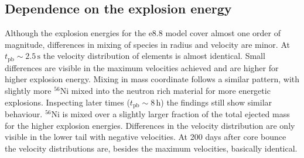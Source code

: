\documentclass[fleqn,usenatbib]{mnras}
\newcommand{\nickel}{\ensuremath{\mathrm{^{56}Ni}}\xspace}
\begin{document}
\subsection{Dependence on the explosion energy}
\label{sec:Dependence on the explosion energy}

Although the explosion energies for the e8.8 model cover almost one order of magnitude, differences in mixing of species in radius and velocity are minor. At $t_{\mathrm{pb}}\sim 2.5 \,\text{s}$ the velocity distribution of elements is almost identical. Small differences are visible in the maximum velocities achieved and are higher for higher explosion energy. Mixing in mass coordinate follows a similar pattern, with slightly more \nickel mixed into the neutron rich material for more energetic explosions. 
Inspecting later times ($t_{\mathrm{pb}}\sim 8 \,\mathrm{h}$) the findings still show similar behaviour. \nickel is mixed over a slightly larger fraction of the total ejected mass for the higher explosion energies. Differences in the velocity distribution are only visible in the lower tail with negative velocities. 
At 200 days after core bounce the velocity distributions are, besides the maximum velocities, basically identical.
\end{document}
